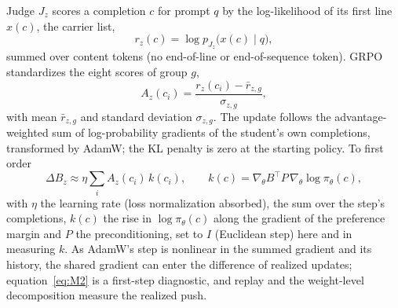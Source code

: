 Judge $J_z$ scores a completion $c$ for prompt $q$ by the log-likelihood of its first line $x(c)$, the carrier list,
\begin{equation}
r_z(c) = \log p_{J_z}\big(x(c) \mid q\big),
\label{eq:r}
\end{equation}
summed over content tokens (no end-of-line or end-of-sequence token). GRPO standardizes the eight scores of group $g$,
\begin{equation}
A_z(c_i) = \frac{r_z(c_i) - \bar r_{z,g}}{\sigma_{z,g}},
\label{eq:M1}
\end{equation}
with mean $\bar r_{z,g}$ and standard deviation $\sigma_{z,g}$. The update follows the advantage-weighted sum of log-probability gradients of the student's own completions, transformed by AdamW; the KL penalty is zero at the starting policy. To first order
\begin{equation}
\Delta B_z \approx \eta \sum_i A_z(c_i)\, k(c_i), \qquad k(c) = \nabla_\theta B^{\top} P\, \nabla_\theta \log \pi_\theta(c),
\label{eq:M2}
\end{equation}
with $\eta$ the learning rate (loss normalization absorbed), the sum over the step's completions, $k(c)$ the rise in $\log \pi_\theta(c)$ along the gradient of the preference margin and $P$ the preconditioning, set to $I$ (Euclidean step) here and in measuring $k$. As AdamW's step is nonlinear in the summed gradient and its history, the shared gradient can enter the difference of realized updates; equation~\eqref{eq:M2} is a first-step diagnostic, and replay and the weight-level decomposition measure the realized push.


